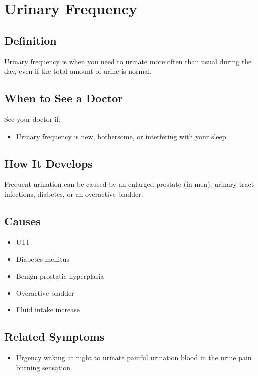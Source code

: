\chapter{Urinary Frequency}

\section*{Definition}
Urinary frequency is when you need to urinate more often than usual during the day, even if the total amount of urine is normal.

\section*{When to See a Doctor}
See your doctor if:
\begin{itemize}
  \item Urinary frequency is new, bothersome, or interfering with your sleep
\end{itemize}

\section*{How It Develops}
Frequent urination can be caused by an enlarged prostate (in men), urinary tract infections, diabetes, or an overactive bladder.

\section*{Causes}
\begin{itemize}
  \item UTI
  \item Diabetes mellitus
  \item Benign prostatic hyperplasia
  \item Overactive bladder
  \item Fluid intake increase
\end{itemize}

\section*{Related Symptoms}
\begin{itemize}
  \item Urgency waking at night to urinate painful urination blood in the urine pain burning sensation
\end{itemize}

